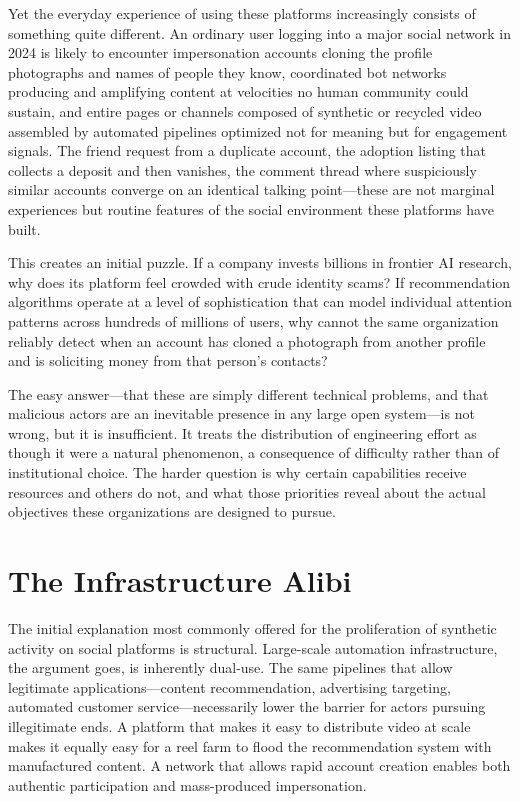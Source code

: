 \documentclass[12pt, a4paper]{article}
\begin{document}
Yet the everyday experience of using these platforms increasingly consists of something quite different. An ordinary user logging into a major social network in 2024 is likely to encounter impersonation accounts cloning the profile photographs and names of people they know, coordinated bot networks producing and amplifying content at velocities no human community could sustain, and entire pages or channels composed of synthetic or recycled video assembled by automated pipelines optimized not for meaning but for engagement signals. The friend request from a duplicate account, the adoption listing that collects a deposit and then vanishes, the comment thread where suspiciously similar accounts converge on an identical talking point---these are not marginal experiences but routine features of the social environment these platforms have built.

This creates an initial puzzle. If a company invests billions in frontier AI research, why does its platform feel crowded with crude identity scams? If recommendation algorithms operate at a level of sophistication that can model individual attention patterns across hundreds of millions of users, why cannot the same organization reliably detect when an account has cloned a photograph from another profile and is soliciting money from that person's contacts?

The easy answer---that these are simply different technical problems, and that malicious actors are an inevitable presence in any large open system---is not wrong, but it is insufficient. It treats the distribution of engineering effort as though it were a natural phenomenon, a consequence of difficulty rather than of institutional choice. The harder question is why certain capabilities receive resources and others do not, and what those priorities reveal about the actual objectives these organizations are designed to pursue.

\section{The Infrastructure Alibi}

The initial explanation most commonly offered for the proliferation of synthetic activity on social platforms is structural. Large-scale automation infrastructure, the argument goes, is inherently dual-use. The same pipelines that allow legitimate applications---content recommendation, advertising targeting, automated customer service---necessarily lower the barrier for actors pursuing illegitimate ends. A platform that makes it easy to distribute video at scale makes it equally easy for a reel farm to flood the recommendation system with manufactured content. A network that allows rapid account creation enables both authentic participation and mass-produced impersonation.
\end{document}
